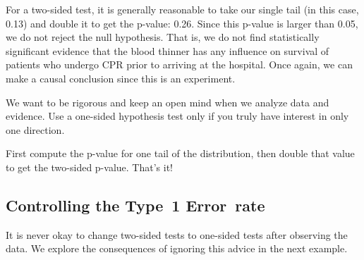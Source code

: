 For a two-sided test, it is generally reasonable to take our single tail (in this case, 0.13) and double it to get the p-value: 0.26. Since this p-value is larger than 0.05, we do not reject the null hypothesis. That is, we do not find statistically significant evidence that the blood thinner has any influence on survival of patients who undergo CPR prior to arriving at the hospital. Once again, we can make a causal conclusion since this is an experiment.


\begin{termBox}{
We want to be rigorous and keep an open mind when we analyze data and evidence. Use a one-sided hypothesis test only if you truly have interest in only one direction.}
\end{termBox}

\begin{termBox}{
First compute the p-value for one tail of the distribution, then double that value to get the two-sided p-value. That's it!}
\end{termBox}


\subsection{Controlling the Type~1 Error~rate}
\label{InflatingType1ErrorRate}

It is never okay to change two-sided tests to one-sided tests after observing the data. We explore the consequences of ignoring this advice in the next example.

